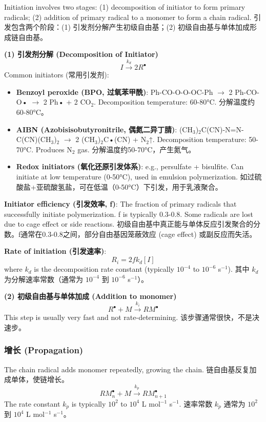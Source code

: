 \documentclass[12pt,a4paper]{ctexart}
\begin{document}
Initiation involves two stages: (1) decomposition of initiator to form primary radicals; (2) addition of primary radical to a monomer to form a chain radical.  
引发包含两个阶段：(1) 引发剂分解产生初级自由基；(2) 初级自由基与单体加成形成链自由基。

\textbf{(1) 引发剂分解 (Decomposition of Initiator)}
\[
I \xrightarrow{k_d} 2R^\bullet
\]
Common initiators (常用引发剂):
\begin{itemize}
    \item \textbf{Benzoyl peroxide (BPO, 过氧苯甲酰)}: Ph-CO-O-O-OC-Ph $\rightarrow$ 2 Ph-CO-O• $\rightarrow$ 2 Ph• + 2 CO$_2$. Decomposition temperature: 60-80°C.  
    分解温度约60-80°C。
    \item \textbf{AIBN (Azobisisobutyronitrile, 偶氮二异丁腈)}: (CH$_3$)$_2$C(CN)-N=N-C(CN)(CH$_3$)$_2$ $\rightarrow$ 2 (CH$_3$)$_2$C•(CN) + N$_2$↑. Decomposition temperature: 50-70°C. Produces N$_2$ gas.  
    分解温度约50-70°C，产生氮气。
    \item \textbf{Redox initiators (氧化还原引发体系)}: e.g., persulfate + bisulfite. Can initiate at low temperature (0-50°C), used in emulsion polymerization.  
    如过硫酸盐+亚硫酸氢盐，可在低温（0-50°C）下引发，用于乳液聚合。
\end{itemize}

\textbf{Initiator efficiency (引发效率, f)}: The fraction of primary radicals that successfully initiate polymerization. f is typically 0.3-0.8. Some radicals are lost due to cage effect or side reactions.  
初级自由基中真正能与单体反应引发聚合的分数。f通常在0.3-0.8之间，部分自由基因笼蔽效应 (cage effect) 或副反应而失活。

\textbf{Rate of initiation (引发速率)}:
\[
R_i = 2 f k_d [I]
\]
where $k_d$ is the decomposition rate constant (typically $10^{-4}$ to $10^{-6}$ s$^{-1}$).  
其中 $k_d$ 为分解速率常数（通常为 $10^{-4}$ 到 $10^{-6}$ s$^{-1}$）。

\textbf{(2) 初级自由基与单体加成 (Addition to monomer)}
\[
R^\bullet + M \xrightarrow{k_i} RM^\bullet
\]
This step is usually very fast and not rate-determining.  
该步骤通常很快，不是决速步。

\subsubsection{增长 (Propagation)}
The chain radical adds monomer repeatedly, growing the chain.  
链自由基反复加成单体，使链增长。
\[
RM_n^\bullet + M \xrightarrow{k_p} RM_{n+1}^\bullet
\]
The rate constant $k_p$ is typically $10^2$ to $10^4$ L mol$^{-1}$ s$^{-1}$.  
速率常数 $k_p$ 通常为 $10^2$ 到 $10^4$ L mol$^{-1}$ s$^{-1}$。
\end{document}
